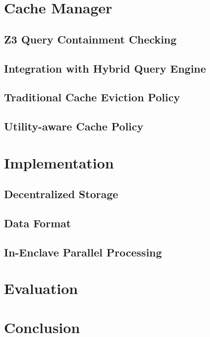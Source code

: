 \section{Cache Manager}
\label{sec:cache}
\subsection{Z3 Query Containment Checking}
\label{sec:z3}
\subsection{Integration with Hybrid Query Engine}
\subsection{Traditional Cache Eviction Policy}
\subsection{Utility-aware Cache Policy}
\label{sec:utility_aware}

\section{Implementation}
\subsection{Decentralized Storage}
\subsection{Data Format}
\subsection{In-Enclave Parallel Processing}

\section{Evaluation}

\section{Conclusion}







